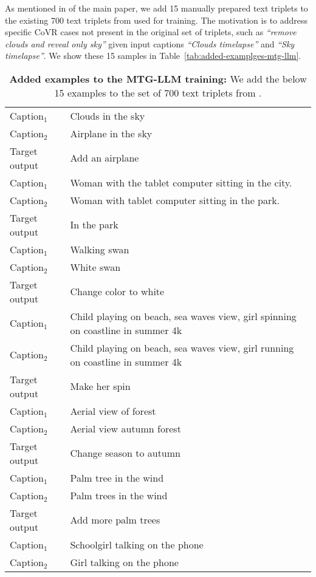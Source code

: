 As mentioned in
\if{} \fi
of the main paper, we add 15 manually prepared text triplets to the existing 
700 text triplets from \cite{brooks2022instructpix2pix} used for training.
The motivation is to address specific
CoVR cases not present in the original set of triplets, such as \textit{``remove clouds and reveal only sky''} 
given input captions \textit{``Clouds timelapse''} and \textit{``Sky timelapse''}.
We show these 15 samples in Table~\ref{tab:added-examplges-mtg-llm}.


\begin{table}\caption{\textbf{Added examples to the MTG-LLM training:}
We add the below 15 examples to the set of 700 text triplets from \cite{brooks2022instructpix2pix}.
}
    \begin{tabular}{ll}
    \toprule
    Caption$_1$ & Clouds in the sky \\
Caption$_2$ & Airplane in the sky \\
Target output & Add an airplane \\
\midrule
Caption$_1$ & Woman with the tablet computer sitting in the city. \\
Caption$_2$ & Woman with tablet computer sitting in the park. \\
Target output & In the park \\
\midrule
Caption$_1$ & Walking swan \\
Caption$_2$ & White swan \\
Target output & Change color to white \\
\midrule
Caption$_1$ & Child playing on beach, sea waves view, girl spinning on coastline in summer 4k \\
Caption$_2$ & Child playing on beach, sea waves view, girl running on coastline in summer 4k \\
Target output & Make her spin \\
\midrule
Caption$_1$ & Aerial view of forest \\
Caption$_2$ & Aerial view autumn forest \\
Target output & Change season to autumn \\
\midrule
Caption$_1$ & Palm tree in the wind \\
Caption$_2$ & Palm trees in the wind \\
Target output & Add more palm trees \\
\midrule
Caption$_1$ & Schoolgirl talking on the phone \\
Caption$_2$ & Girl talking on the phone \\

\end{tabular}
\end{table}
